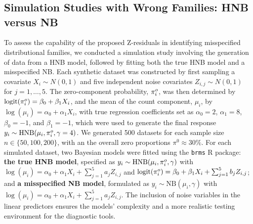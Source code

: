 \documentclass[
  12pt]{article}
\theoremstyle{plain}
\theoremstyle{definition}
\theoremstyle{remark}
\begin{document}
               


\clearpage

\section{}

\subsection{Simulation Studies with Wrong Families: HNB versus NB}\label{simulation_wrong_family}


To assess the capability of the proposed Z-residuals in identifying misspecified distributional families, we conducted a simulation study involving the generation of data from a HNB model, followed by fitting both the true HNB model and a misspecified NB. Each synthetic dataset was constructed by first sampling a covariate $X_i \sim N(0,1)$ and five independent noise covariates $Z_{i,j} \sim N(0,1)$ for $j=1, \dots, 5$. The zero-component probability, $\pi^o_{i}$, was then determined by $\text{logit}(\pi^o_{i}) = \beta_0 + \beta_1 X_i$, and the mean of the count component, $\mu_i$, by $\log(\mu_i) = \alpha_0 + \alpha_1 X_i$, with true regression coefficients set as $\alpha_0 = 2$, $\alpha_1 = 8$, $\beta_0 = -1$, and $\beta_1 = -1$, which were used to generate the final response $y_i \sim \text{HNB}(\mu_i, \pi^o_{i}, \gamma=4)$. We generated 500 datasets for each sample size $n\in\{50,100,200\}$, with an the overall zero proportions $\pi^0 \approx 30\%$. For each simulated dataset, two Bayesian models were fitted using the \texttt{brms} R package: \textbf{the true HNB model}, specified as $y_i \sim \text{HNB}(\mu_i, \pi^o_{i}, \gamma)$ with $\log(\mu_i) = \alpha_0 + \alpha_1 X_i + \sum_{j=1}^5 a_j Z_{i,j}$ and $\text{logit}(\pi^o_{i}) = \beta_0 + \beta_1 X_i + \sum_{j=1}^5 b_j Z_{i,j}$; and \textbf{a misspecified NB model}, formulated as $y_i \sim \text{NB}(\mu_i, \gamma)$ with $\log(\mu_i) = \alpha_0 + \alpha_1 X_i + \sum_{j=1}^5 a_j Z_{i,j}$. The inclusion of noise variables in the linear predictors ensures the models' complexity and a more realistic testing environment for the diagnostic tools.
\end{document}
